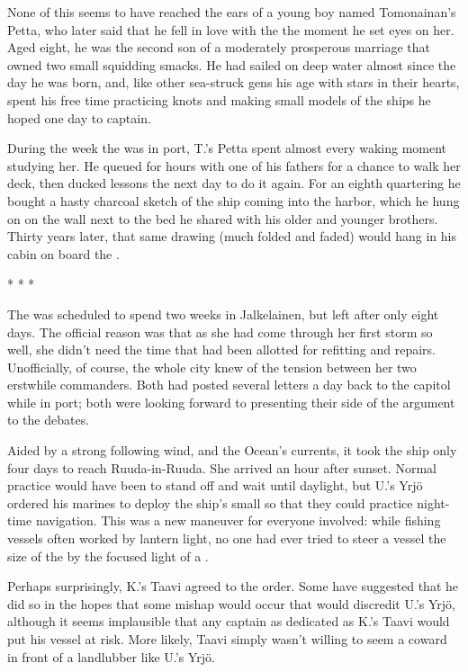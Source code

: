 \documentclass[12pt]{report}
\begin{document}
None of this seems to have reached the ears of a young boy named
Tomonainan's Petta, who later said that he fell in love with the
 the moment he set eyes on her.  Aged eight, he
was the second son of a moderately prosperous marriage that owned two
small squidding smacks.  He had sailed on deep water almost since the
day he was born, and, like other sea-struck gens his age with stars in
their hearts, spent his free time practicing knots and making small
models of the ships he hoped one day to captain.

During the week the  was in port, T.'s Petta
spent almost every waking moment studying her.  He queued for hours
with one of his fathers for a chance to walk her deck, then ducked
lessons the next day to do it again.  For an eighth quartering he
bought a hasty charcoal sketch of the ship coming into the harbor,
which he hung on on the wall next to the bed he shared with his older
and younger brothers.  Thirty years later, that same drawing (much
folded and faded) would hang in his cabin on board the {\UL}.

\begin{center}
* * *
\end{center}

The  was scheduled to spend two weeks in
Jalkelainen, but left after only eight days.  The official reason was
that as she had come through her first storm so well, she didn't need
the time that had been allotted for refitting and repairs.
Unofficially, of course, the whole city knew of the tension between
her two erstwhile commanders.  Both had posted several letters a day
back to the capitol while in port; both were looking forward to
presenting their side of the argument to the debates.

Aided by a strong following wind, and the Ocean's currents, it took
the ship only four days to reach Ruuda-in-Ruuda.  She arrived an hour
after sunset.  Normal practice would have been to stand off and wait
until daylight, but U.'s Yrj\"{o} ordered his marines to deploy the
ship's small  so that they could practice
night-time navigation.  This was a new maneuver for everyone involved:
while fishing vessels often worked by lantern light, no one had ever
tried to steer a vessel the size of the  by the
focused light of a .

Perhaps surprisingly, K.'s Taavi agreed to the order.  Some have
suggested that he did so in the hopes that some mishap would occur
that would discredit U.'s Yrj\"{o}, although it seems implausible that
any captain as dedicated as K.'s Taavi would put his vessel at risk.
More likely, Taavi simply wasn't willing to seem a coward in front of
a landlubber like U.'s Yrj\"{o}.
\end{document}
